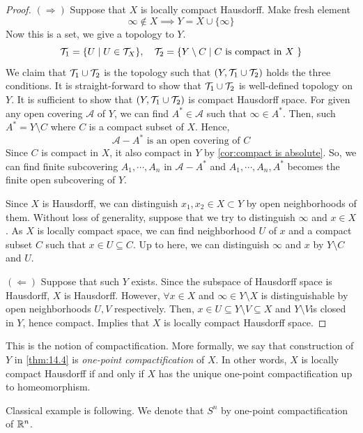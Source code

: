 \documentclass[12pt, a4paper, twoside]{article}
\newcommand{\CA}{{\mathcal {A}}} \newcommand{\CB}{{\mathcal {B}}}
\theoremstyle{plain}
\begin{document}
\begin{proof}
    $(\Rightarrow)$ Suppose that $X$ is locally compact Hausdorff. 
    Make fresh element 
    \[\infty \notin X \implies Y = X \cup \{\infty\}\]
    Now this is a set, we give a topology to $Y$. 
    \[{\mathcal {T}}_1 = \{U \mid U \in {\mathcal {T}}_X\}, \quad {\mathcal {T}}_2 = \{Y \setminus C \mid C \text{ is compact in $X$ }\}\]
    We claim that ${\mathcal {T}}_1 \cup {\mathcal {T}}_2$ is the topology such that $(Y, {\mathcal {T}}_1 \cup {\mathcal {T}}_2)$ holds 
    the three conditions. 
    It is straight-forward to show that ${\mathcal {T}}_1 \cup {\mathcal {T}}_2$ is well-defined topology on $Y$. 
    It is sufficient to show that $(Y, {\mathcal {T}}_1 \cup {\mathcal {T}}_2)$ is compact Hausdorff space. 
    For given any open covering $\CA$ of $Y$, we can find $A^* \in \CA$ such that $\infty \in A^*$. Then, 
    such $A^* = Y \setminus C$ where $C$ is a compact subset of $X$. 
    Hence, 
    \[\CA - A^* \text{ is an open covering of } C \]
    Since $C$ is compact in $X$, it also compact in $Y$ by \ref{cor:compact is absolute}. 
    So, we can find finite subcovering $A_1, \cdots, A_n$ in $\CA - A^*$ and $A_1, \cdots, A_n, A^*$ 
    becomes the finite open subcovering of $Y$. 

    Since $X$ is Hausdorff, we can distinguish $x_1, x_2 \in X \subset Y$ by open neighborhoods of them. 
    Without loss of generality, suppose that we try to distinguish $\infty$ and $x \in X$. 
    As $X$ is locally compact space, we can find neighborhood $U$ of $x$ and a compact subset $C$ such that 
    $x \in U \subseteq C$. Up to here, we can distinguish $\infty$ and $x$ by $Y \setminus C$ and $U$. 

    $(\Leftarrow)$ Suppose that such $Y$ exists. Since the subspace of Hausdorff space is Hausdorff, 
    $X$ is Hausdorff. However, $\forall x \in X$ and $\infty \in Y \setminus X$ is distinguishable by open neighborhoods $U, V$ respectively. 
    Then, $x \in U \subseteq Y \setminus V \subseteq X$ and $Y \setminus V$is closed in $Y$, hence compact. 
    Implies that $X$ is locally compact Hausdorff space. 
\end{proof}

This is the notion of compactification. More formally, we say that construction of $Y$ in \ref{thm:14.4} 
is \textit{one-point compactification} of $X$. In other words, $X$ is locally compact Hausdorff if and only if $X$ has the unique one-point compactification up to homeomorphism. 

Classical example is following. We denote that $S^n$ by one-point compactification of ${\mathbb {R}}^n$. 
\end{document}
